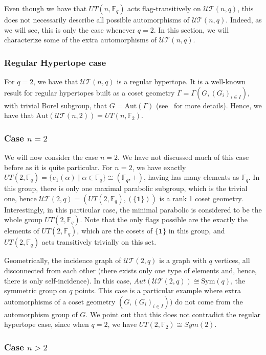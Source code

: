 \documentclass[11pt,letterpaper]{amsart}
\newcommand{\TT}{\mathcal{T}}
\newcommand{\Aut}{\mathrm{Aut}}
\newcommand{\Sym}{\mathrm{Sym}}
\newcommand{\FF}{\mathbb{F}}
\newcommand{\UU}{\mathcal{U}}
\begin{document}
Even though we have that $UT(n,\FF_q)$ acts flag-transitively on $\UU\TT(n,q)$, this does not necessarily describe all possible automorphisms of $\UU\TT(n,q)$. Indeed, as we will see, this is only the case whenever $q=2$. 
In this section, we will characterize some of the extra automorphisms of $\UU\TT(n,q)$.

\subsubsection{Regular Hypertope case}
For $q=2$, we have that $\UU\TT(n,q)$ is a regular hypertope.
It is a well-known result for regular hypertopes built as a coset geometry $\Gamma = \Gamma(G,(G_i)_{i\in I})$, with trivial Borel subgroup, that $G = \Aut(\Gamma)$ (see~\cite{hypertopes} for more details). Hence, we have that $\Aut(\UU\TT(n,2)) = UT(n,\FF_2)$.



\subsubsection{Case $n=2$}
We will now consider the case $n=2$. We have not discussed much of this case before as it is quite particular.
For $n=2$, we have exactly $UT(2,\FF_q) = \{e_{1}(\alpha) \mid \alpha\in \FF_q\}\cong (\FF_q,+) $, having has many elements as $\FF_q$.
In this group, there is only one maximal parabolic subgroup, which is the trivial one, hence $\UU\TT(2,q) =(UT(2,\FF_q), (\{\textbf{1}\}))$ is a rank 1 coset geometry. Interestingly, in this particular case, the minimal parabolic is considered to be the whole group $UT(2,\FF_q)$.
Note that the only flags possible are the exactly the elements of $UT(2,\FF_q)$, which are the cosets of $\{\textbf{1}\}$ in this group, and  $UT(2,\FF_q)$ acts transitively trivially on this set. 

Geometrically, the incidence graph of $\UU\TT(2,q)$ is a graph with $q$ vertices, all disconnected from each other (there exists only one type of elements and, hence, there is only self-incidence).
In this case, $Aut(\UU\TT(2,q)) \cong  \Sym(q)$, the symmetric group on $q$ points. This case is a particular example where extra automorphisms of a coset geometry $(G,(G_i)_{i\in I}))$ do not come from the automorphism group of $G$. We point out that this does not contradict the regular hypertope case, since when $q=2$, we have $UT(2,\FF_2) \cong Sym(2)$.


\subsubsection{Case $n>2$}
\end{document}
